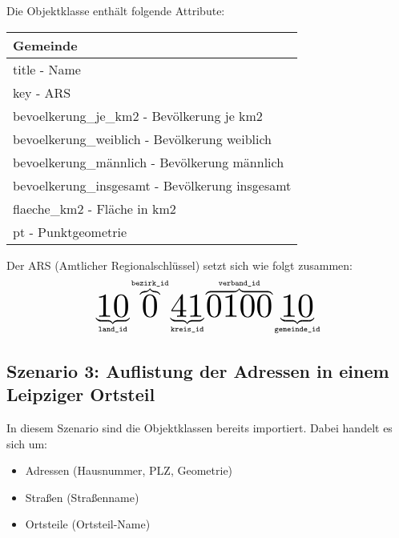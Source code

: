 \vspace{\baselineskip}\noindent
Die Objektklasse enthält folgende Attribute:
\begin{flushleft}
  \begin{tabular}{ || l || }
    \hline
    Gemeinde                                        \\
    \hline
    title - Name                                    \\
    key - ARS                                       \\
    bevoelkerung\_je\_km2 - Bevölkerung je km2      \\
    bevoelkerung\_weiblich - Bevölkerung weiblich   \\
    bevoelkerung\_männlich - Bevölkerung männlich   \\
    bevoelkerung\_insgesamt - Bevölkerung insgesamt \\
    flaeche\_km2 - Fläche in km2                    \\
    pt - Punktgeometrie                             \\
    \hline
  \end{tabular}
\end{flushleft}

\vspace{\baselineskip}\noindent
Der ARS (Amtlicher Regionalschlüssel) setzt sich wie folgt zusammen:
\[
  \underbrace{\scalebox{3}{10}}_{\texttt{land\_id}}\overbrace{\scalebox{3}{0}}^{\texttt{bezirk\_id}}\underbrace{\scalebox{3}{41}}_{\texttt{kreis\_id}}\overbrace{\scalebox{3}{0100}}^{\texttt{verband\_id}}\underbrace{\scalebox{3}{10}}_{\texttt{gemeinde\_id}}
\]

\clearpage

\subsection*{Szenario 3: Auflistung der Adressen in einem Leipziger Ortsteil}

\vspace{\baselineskip}\noindent
In diesem Szenario sind die Objektklassen bereits importiert. Dabei handelt es sich um:
\begin{itemize}
  \item Adressen (Hausnummer, PLZ, Geometrie)
  \item Straßen (Straßenname)
  \item Ortsteile (Ortsteil-Name)
\end{itemize}

